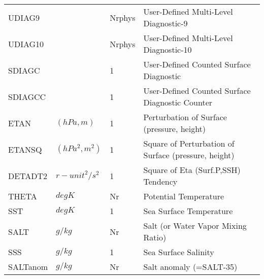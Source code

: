 \begin{tabular}{llll}
 UDIAG9   &             &    Nrphys  
         &\begin{minipage}[t]{3in}
          {User-Defined Multi-Level Diagnostic-9} 
         \end{minipage}\\
 UDIAG10  &             &    Nrphys  
         &\begin{minipage}[t]{3in}
          {User-Defined Multi-Level Diagnostic-10} 
         \end{minipage}\\
 SDIAGC   &             &    1  
         &\begin{minipage}[t]{3in}
          {User-Defined Counted Surface Diagnostic} 
         \end{minipage}\\
 SDIAGCC  &             &    1  
         &\begin{minipage}[t]{3in}
          {User-Defined Counted Surface Diagnostic Counter} 
         \end{minipage}\\
 ETAN     & $(hPa,m)$ &    1
         &\begin{minipage}[t]{3in}
          {Perturbation of Surface (pressure, height)} 
         \end{minipage}\\
 ETANSQ   & $(hPa^2,m^2)$ & 1
         &\begin{minipage}[t]{3in}
          {Square of Perturbation of Surface (pressure, height)} 
         \end{minipage}\\
 DETADT2  & ${r-unit}^2/s^2$ & 1
         &\begin{minipage}[t]{3in}
          {Square of Eta (Surf.P,SSH) Tendency} 
         \end{minipage}\\
 THETA    & $deg K$ & Nr
         &\begin{minipage}[t]{3in}
          {Potential Temperature} 
         \end{minipage}\\
 SST      & $deg K$ & 1
         &\begin{minipage}[t]{3in}
          {Sea Surface Temperature} 
         \end{minipage}\\
 SALT     & $g/kg$ & Nr
         &\begin{minipage}[t]{3in}
          {Salt (or Water Vapor Mixing Ratio)} 
         \end{minipage}\\
 SSS      & $g/kg$ & 1
         &\begin{minipage}[t]{3in}
          {Sea Surface Salinity} 
         \end{minipage}\\
 SALTanom & $g/kg$ & Nr
         &\begin{minipage}[t]{3in}
          {Salt anomaly (=SALT-35)} 
         \end{minipage}\\
\end{tabular}
\vspace{1.5in}
\vfill

